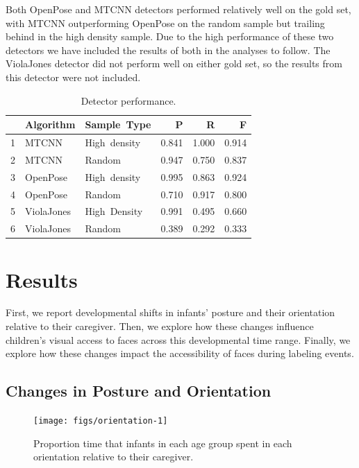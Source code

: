 \documentclass[10pt, letterpaper]{article}
\newenvironment{CodeChunk}{}{}
\begin{document}
Both OpenPose and MTCNN detectors performed relatively well on the gold
set, with MTCNN outperforming OpenPose on the random sample but trailing
behind in the high density sample. Due to the high performance of these
two detectors we have included the results of both in the analyses to
follow. The ViolaJones detector did not perform well on either gold set,
so the results from this detector were not included.

\begin{table}[ht]
\centering
\begin{tabular}{rllrrr}
  \hline
 & Algorithm & Sample\ Type & P & R & F \\ 
  \hline
1 & MTCNN & High\ density & 0.841 & 1.000 & 0.914 \\ 
  2 & MTCNN & Random & 0.947 & 0.750 & 0.837 \\ 
  3 & OpenPose & High\ density & 0.995 & 0.863 & 0.924 \\ 
  4 & OpenPose & Random & 0.710 & 0.917 & 0.800 \\ 
  5 & ViolaJones & High\ Density & 0.991 & 0.495 & 0.660 \\ 
  6 & ViolaJones & Random & 0.389 & 0.292 & 0.333 \\ 
   \hline
\end{tabular}
\caption{Detector performance.} 
\end{table}

\section{Results}\label{results}

First, we report developmental shifts in infants' posture and their
orientation relative to their caregiver. Then, we explore how these
changes influence children's visual access to faces across this
developmental time range. Finally, we explore how these changes impact
the accessibility of faces during labeling events.

\subsection{Changes in Posture and
Orientation}\label{changes-in-posture-and-orientation}

\begin{CodeChunk}
\begin{figure}[h]

{\centering \texttt{[image: figs/orientation-1]} 

}

\caption[Proportion time that infants in each age group spent in each orientation relative to their caregiver]{Proportion time that infants in each age group spent in each orientation relative to their caregiver.}\label{fig:orientation}
\end{figure}
\end{CodeChunk}
\end{document}
